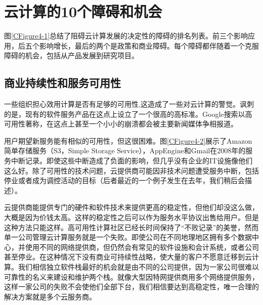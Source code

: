 
\section{云计算的10个障碍和机会}

图\ref{CFigure4-1}总结了阻碍云计算发展的决定性的障碍的排名列表。前三个影响应用，后五个影响增长，最后的两个是政策和商业障碍。每个障碍都伴随着一个克服障碍的机会，包括从产品发展到研究项目。


\subsection{商业持续性和服务可用性}

一些组织担心效用计算是否有足够的可用性,这造成了一些对云计算的警觉。讽刺的是，现有的软件服务产品在这点上设立了一个很高的高标准。Google搜索以高可用性著称，在这点上甚至一个小小的崩溃都会被主要新闻媒体争相报道。

用户期望新服务能有相似的可用性，但这很困难。图\ref{CFigure4-2}展示了Amazon简单存储服务（S3，Simple Storage Service），AppEngine和Gmail在2008年的服务中断记录。即使这些中断造成了负面的影响，但几乎没有企业的IT设施像他们这么好。除了可用性的技术问题，云提供商可能因非技术问题遭受服务中断，包括停业或者成为调控活动的目标（后者最近的一个例子发生在去年，我们稍后会描述）。

云提供商能提供专门的硬件和软件技术来提供更高的稳定性，但他们却没这么做，大概是因为价钱太高。这样的稳定性之后可以作为服务水平协议出售给用户。但是这种方法只能这样。高可用性计算社区已经长时间保持了“不败记录”的美誉，然而单一公司管理云计算服务就是一个失败。即使公司在不同地理地区拥有多个数据中心，并使用不同的网络提供商，但仍然会有常见的软件设施和会计系统，或者公司甚至停业。在这种情况下没有商业可持续性战略，使大量的客户不愿意迁移到云计算。我们相信独立软件栈最好的机会就是由不同的公司提供，因为一家公司很难以可靠性的名义来建设和维护两个栈。就像大型因特网提供商用多个网络提供服务，这样一家公司的失败不会使他们全部下台，我们相信要达到高稳定性，唯一合理的解决方案就是多个云服务商。


